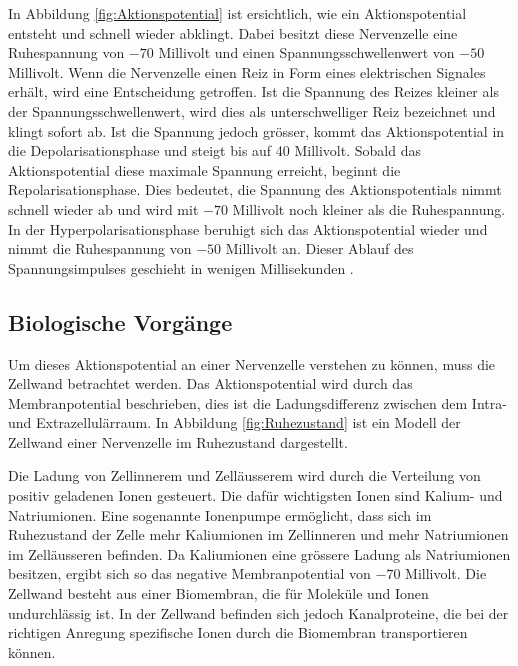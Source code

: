 In Abbildung \ref{fig:Aktionspotential} ist ersichtlich, wie ein Aktionspotential entsteht und schnell wieder abklingt.
Dabei besitzt diese Nervenzelle eine Ruhespannung von $-70$ Millivolt und einen Spannungsschwellenwert von $-50$ Millivolt.
Wenn die Nervenzelle einen Reiz in Form eines elektrischen Signales erhält, wird eine Entscheidung getroffen. 
Ist die Spannung des Reizes kleiner als der Spannungsschwellenwert, wird dies als unterschwelliger Reiz bezeichnet und klingt sofort ab.
Ist die Spannung jedoch grösser, kommt das Aktionspotential in die Depolarisationsphase und steigt bis auf 40 Millivolt.
Sobald das Aktionspotential diese maximale Spannung erreicht, beginnt die Repolarisationsphase.
Dies bedeutet, die Spannung des Aktionspotentials nimmt schnell wieder ab und wird mit $-70$ Millivolt noch kleiner als die Ruhespannung.
In der Hyperpolarisationsphase beruhigt sich das Aktionspotential wieder und nimmt die Ruhespannung von $-50$ Millivolt an.
Dieser Ablauf des Spannungsimpulses geschieht in wenigen Millisekunden 
\cite{nerven:InaLammers.31.08.2015}.

\subsection{Biologische Vorgänge}



Um dieses Aktionspotential an einer Nervenzelle verstehen zu können, muss die Zellwand betrachtet werden. 
Das Aktionspotential wird durch das Membranpotential beschrieben, dies ist die Ladungsdifferenz zwischen dem Intra- und
Extrazellulärraum.
In Abbildung \ref{fig:Ruhezustand} ist ein Modell der Zellwand einer Nervenzelle im Ruhezustand dargestellt.

Die Ladung von Zellinnerem und Zelläusserem wird durch die Verteilung von positiv geladenen Ionen gesteuert.
Die dafür wichtigsten Ionen sind Kalium- und Natriumionen. 
%
%
Eine sogenannte Ionenpumpe ermöglicht, dass sich im Ruhezustand der Zelle mehr Kaliumionen im Zellinneren und mehr
%
Natriumionen im Zelläusseren befinden.
Da Kaliumionen eine grössere Ladung als Natriumionen besitzen, ergibt sich so das negative Membranpotential von $-70$
Millivolt.
Die Zellwand besteht aus einer Biomembran, die für Moleküle und Ionen undurchlässig ist.
%
%
In der Zellwand befinden sich jedoch Kanalproteine, die bei der richtigen Anregung spezifische Ionen durch die
%
Biomembran transportieren können.

